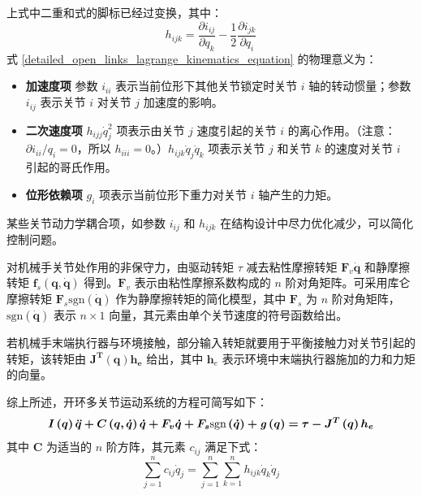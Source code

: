 \documentclass[cn,11pt,chinese,blue,bibstyle=ieeetr]{elegantbook}
\begin{document}
上式中二重和式的脚标已经过变换，其中：
\begin{equation}\label{quadratic_velocity_terms_1}
h_{ijk} = \frac{\partial i_{ij}}{\partial q_k} - \frac{1}{2}  \frac{\partial i_{jk}}{\partial q_i}
\end{equation}
式 \ref{detailed_open_links_lagrange_kinematics_equation} 的物理意义为：
\begin{itemize}
	\item \textbf{加速度项} 参数 $i_{ii}$ 表示当前位形下其他关节锁定时关节 $i$ 轴的转动惯量；参数 $i_{ij}$ 表示关节 $i$ 对关节 $j$ 加速度的影响。
	\item \textbf{二次速度项} $h_{ijj} \dot{q}_j^2$ 项表示由关节 $j$ 速度引起的关节 $i$ 的离心作用。（注意：${\partial i_{ii}}/{q_i} = 0$，所以 $h_{iii} = 0$。）$h_{ijk} \dot{q}_j \dot{q}_k$ 项表示关节 $j$ 和关节 $k$ 的速度对关节 $i$ 引起的哥氏作用。
	\item \textbf{位形依赖项} $\textit{g}_i$ 项表示当前位形下重力对关节 $i$ 轴产生的力矩。
\end{itemize}

某些关节动力学耦合项，如参数 $i_{ij}$ 和 $h_{ijk}$ 在结构设计中尽力优化减少，可以简化控制问题。

对机械手关节处作用的非保守力，由驱动转矩 $\tau$ 减去粘性摩擦转矩 $\bm{F}_v \bm{\dot q}$ 和静摩擦转矩 $\bm{f}_s (\bm{q}, \bm{\dot q})$ 得到。$\bm{F}_v$ 表示由粘性摩擦系数构成的 $n$ 阶对角矩阵。可采用库仑摩擦转矩 $\bm{F}_s \text{sgn}(\bm{\dot q})$ 作为静摩擦转矩的简化模型，其中 $\bm{F}_s$ 为 $n$ 阶对角矩阵，$\text{sgn}(\bm{\dot q})$ 表示 $n \times 1$ 向量，其元素由单个关节速度的符号函数给出。

若机械手末端执行器与环境接触，部分输入转矩就要用于平衡接触力对关节引起的转矩，该转矩由 $\bm{{J}^T \left(q\right) {h}_e}$ 给出，其中 $\bm{h}_e$ 表示环境中末端执行器施加的力和力矩的向量。

综上所述，开环多关节运动系统的方程可简写如下：
\begin{equation}\label{brief_open_links_lagrange_kinematics_equation}
\bm{\bm{I}\left(q\right)\ddot{q} + C\left(q, \dot{q}\right)\dot{q} + F_v\dot{q} + F_s \text{sgn}\left(\dot{q}\right) + \textbf{\textit{g}}\left(q\right) = \tau - J^T\left(q\right)h_e}
\end{equation}
其中 $\bm C$ 为适当的 $n$ 阶方阵，其元素 $c_{ij}$ 满足下式：
\begin{equation}\label{quadratic_velocity_terms_2}
\sum_{j=1}^{n} {c_{ij}\dot{q}_{j}} = \sum_{j=1}^{n} \sum_{k=1}^{n} {h_{ijk}\dot{q}_k\dot{q}_j}
\end{equation}
\end{document}
